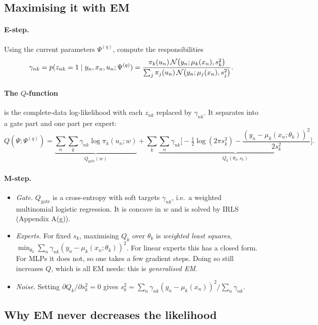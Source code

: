 \subsection{Maximising it with EM}

\paragraph{E-step.} Using the current parameters $\Psi^{(q)}$, compute the responsibilities
\begin{equation}
\gamma_{nk}=p(z_{nk}=1\mid y_n,x_n,u_n;\Psi^{(q)})=\frac{\pi_k(u_n)\,\mathcal{N}\big(y_n;\mu_k(x_n),s_k^2\big)}{\sum_j\pi_j(u_n)\,\mathcal{N}\big(y_n;\mu_j(x_n),s_j^2\big)}.
\end{equation}
\paragraph{The $Q$-function} is the complete-data log-likelihood with each $z_{nk}$ replaced by $\gamma_{nk}$. It separates into a gate part and one part per expert:
\begin{equation}
Q(\Psi;\Psi^{(q)})=\underbrace{\sum_n\sum_k\gamma_{nk}\log\pi_k(u_n;w)}_{Q_{\text{gate}}(w)}+\sum_k\underbrace{\sum_n\gamma_{nk}\Big[-\tfrac12\log(2\pi s_k^2)-\frac{(y_n-\mu_k(x_n;\theta_k))^2}{2s_k^2}\Big]}_{Q_k(\theta_k,s_k)}.
\end{equation}
\paragraph{M-step.}
\begin{itemize}
  \item \emph{Gate.} $Q_{\text{gate}}$ is a cross-entropy with soft targets $\gamma_{nk}$, i.e.\ a weighted multinomial logistic regression. It is concave in $w$ and is solved by IRLS (Appendix A(g)).
  \item \emph{Experts.} For fixed $s_k$, maximising $Q_k$ over $\theta_k$ is \emph{weighted least squares}, $\min_{\theta_k}\sum_n\gamma_{nk}(y_n-\mu_k(x_n;\theta_k))^2$. For linear experts this has a closed form. For MLPs it does not, so one takes a few gradient steps. Doing so still increases $Q$, which is all EM needs: this is \emph{generalised EM}.
  \item \emph{Noise.} Setting $\partial Q_k/\partial s_k^2=0$ gives $s_k^2=\sum_n\gamma_{nk}(y_n-\mu_k(x_n))^2\big/\sum_n\gamma_{nk}$.
\end{itemize}

\subsection{Why EM never decreases the likelihood}

